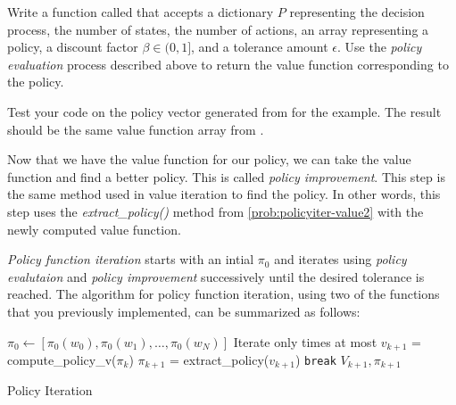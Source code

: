 \begin{problem}
\label{prob:policyiter-value3}
Write a function called  that accepts a dictionary $P$ representing the decision process, the number of states, the number of actions, an array representing a policy, a discount factor $\beta \in (0,1]$, and a tolerance amount $\epsilon$.
Use the \emph{policy evaluation} process described above to return the value function corresponding to the policy.

Test your code on the policy vector generated from  for the example.
The result should be the same value function array from .
\end{problem}

Now that we have the value function for our policy, we can take the value function and find a better policy.
This is called \emph{policy improvement}.
This step is the same method used in value iteration to find the policy.
In other words, this step uses the \emph{extract\_policy()} method from \ref{prob:policyiter-value2} with the newly computed value function.

\emph{Policy function iteration} starts with an intial $\pi_{0}$ and iterates using \emph{policy evalutaion} and \emph{policy improvement} successively until the desired tolerance is reached.
The algorithm for policy function iteration, using two of the functions that you previously implemented, can be summarized as follows:

\begin{algorithm}[H]
\begin{algorithmic}[1]
    \State $\pi_0 \gets [\pi_0(w_0),\pi_0(w_1),\ldots,\pi_0(w_N)] $
        \Comment Iterate only  times at most
        \State $v_{k+1}$ = compute\_policy\_v($\pi_{k}$)
        \State $\pi_{k+1}$ = extract\_policy($v_{k+1}$)
            \State \texttt{break}
        \EndIf
    \EndFor
    \State {} $V_{k+1}, \pi_{k+1}$
\EndProcedure
\end{algorithmic}
\caption{Policy Iteration}
\label{alg:PolicyIteration}
\end{algorithm}

